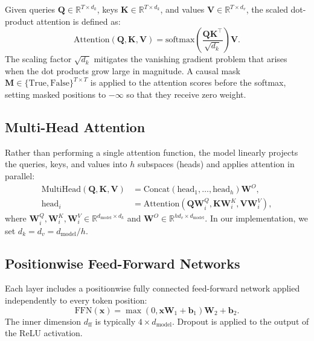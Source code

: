 \documentclass[10pt]{article}
\begin{document}
Given queries $\mathbf{Q} \in \mathbb{R}^{T \times d_k}$, keys $\mathbf{K} \in \mathbb{R}^{T \times d_k}$, and values $\mathbf{V} \in \mathbb{R}^{T \times d_v}$, the scaled dot-product attention is defined as:
\begin{equation}
\text{Attention}(\mathbf{Q}, \mathbf{K}, \mathbf{V}) = \text{softmax}\!\left(\frac{\mathbf{Q} \mathbf{K}^\top}{\sqrt{d_k}}\right) \mathbf{V}.
\end{equation}
The scaling factor $\sqrt{d_k}$ mitigates the vanishing gradient problem that arises when the dot products grow large in magnitude. A causal mask $\mathbf{M} \in \{\text{True}, \text{False}\}^{T \times T}$ is applied to the attention scores before the softmax, setting masked positions to $-\infty$ so that they receive zero weight.

\subsection{Multi-Head Attention}

Rather than performing a single attention function, the model linearly projects the queries, keys, and values into $h$ subspaces (heads) and applies attention in parallel:
\begin{equation}
\begin{aligned}
\text{MultiHead}(\mathbf{Q}, \mathbf{K}, \mathbf{V}) &= \text{Concat}(\text{head}_1, \ldots, \text{head}_h) \mathbf{W}^O, \\
\text{head}_i &= \text{Attention}(\mathbf{Q} \mathbf{W}_i^Q, \mathbf{K} \mathbf{W}_i^K, \mathbf{V} \mathbf{W}_i^V),
\end{aligned}
\end{equation}
where $\mathbf{W}_i^Q, \mathbf{W}_i^K, \mathbf{W}_i^V \in \mathbb{R}^{d_{\text{model}} \times d_k}$ and $\mathbf{W}^O \in \mathbb{R}^{h d_v \times d_{\text{model}}}$. In our implementation, we set $d_k = d_v = d_{\text{model}} / h$.

\subsection{Positionwise Feed-Forward Networks}

Each layer includes a positionwise fully connected feed-forward network applied independently to every token position:
\begin{equation}
\text{FFN}(\mathbf{x}) = \max(0, \mathbf{x} \mathbf{W}_1 + \mathbf{b}_1) \mathbf{W}_2 + \mathbf{b}_2.
\end{equation}
The inner dimension $d_{\text{ff}}$ is typically $4 \times d_{\text{model}}$. Dropout is applied to the output of the ReLU activation.
\end{document}
